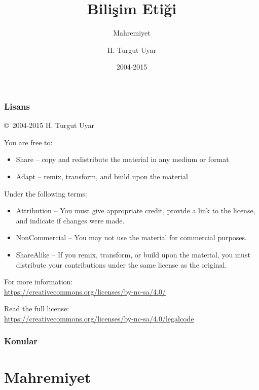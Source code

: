 \documentclass[dvipsnames]{beamer}
\title{Bilişim Etiği}
\subtitle{Mahremiyet}
\author{H. Turgut Uyar}
\date{2004-2015}
\theoremstyle{plain}
\begin{document}
\begin{frame}
  \titlepage
\end{frame}

\begin{frame}
  \frametitle{Lisans}

  \hfill
  \copyright~2004-2015 H. Turgut Uyar

  \vfill
  \begin{footnotesize}
    You are free to:
    \begin{itemize}
      \itemsep0em
      \item Share -- copy and redistribute the material in any medium or format
      \item Adapt -- remix, transform, and build upon the material
    \end{itemize}

    Under the following terms:
    \begin{itemize}
      \itemsep0em
      \item Attribution -- You must give appropriate credit, provide a link to
        the license, and indicate if changes were made.

      \item NonCommercial -- You may not use the material for commercial
        purposes.

      \item ShareAlike -- If you remix, transform, or build upon the material,
        you must distribute your contributions under the same license as the
        original.
    \end{itemize}
  \end{footnotesize}

  \begin{small}
    For more information:\\
    \url{https://creativecommons.org/licenses/by-nc-sa/4.0/}

    \smallskip
    Read the full license:\\
    \url{https://creativecommons.org/licenses/by-nc-sa/4.0/legalcode}
  \end{small}
\end{frame}

\begin{frame}
  \frametitle{Konular}
  \tableofcontents
\end{frame}

\section{Mahremiyet}
\end{document}
